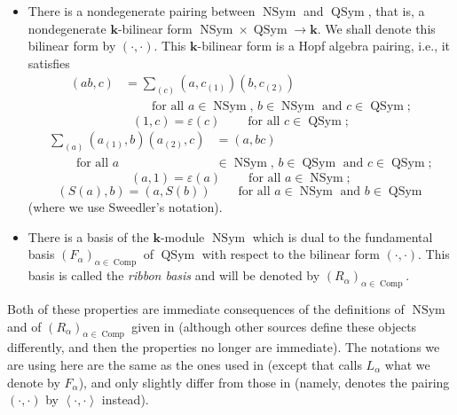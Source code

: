 \documentclass[numbers=enddot,12pt,final,onecolumn,notitlepage,abstracton]{scrartcl}%
\theoremstyle{definition}
\let\sumnonlimits\sum
\renewcommand{\sum}{\sumnonlimits\limits}
\begin{document}
\begin{itemize}
\item There is a nondegenerate pairing between $\operatorname*{NSym}$ and
$\operatorname*{QSym}$, that is, a nondegenerate $\mathbf{k}$-bilinear form
$\operatorname*{NSym}\times\operatorname*{QSym}\rightarrow\mathbf{k}$. We
shall denote this bilinear form by $\left(  \cdot,\cdot\right)  $. This
$\mathbf{k}$-bilinear form is a Hopf algebra pairing, i.e., it satisfies%
\begin{align}
\left(  ab,c\right)   &  =\sum_{\left(  c\right)  }\left(  a,c_{\left(
1\right)  }\right)  \left(  b,c_{\left(  2\right)  }\right)  \label{eq.(ab,c)}%
\\
&  \ \ \ \ \ \ \ \ \ \ \text{for all }a\in\operatorname*{NSym}\text{, }%
b\in\operatorname*{NSym}\text{ and }c\in\operatorname*{QSym};\nonumber
\end{align}%
\[
\left(  1,c\right)  =\varepsilon\left(  c\right)
\ \ \ \ \ \ \ \ \ \ \text{for all }c\in\operatorname*{QSym};
\]%
\begin{align*}
\sum_{\left(  a\right)  }\left(  a_{\left(  1\right)  },b\right)  \left(
a_{\left(  2\right)  },c\right)   &  =\left(  a,bc\right) \\
\ \ \ \ \ \ \ \ \ \ \text{for all }a  &  \in\operatorname*{NSym}\text{, }%
b\in\operatorname*{QSym}\text{ and }c\in\operatorname*{QSym};
\end{align*}%
\[
\left(  a,1\right)  =\varepsilon\left(  a\right)
\ \ \ \ \ \ \ \ \ \ \text{for all }a\in\operatorname*{NSym};
\]%
\[
\left(  S\left(  a\right)  ,b\right)  =\left(  a,S\left(  b\right)  \right)
\ \ \ \ \ \ \ \ \ \ \text{for all }a\in\operatorname*{NSym}\text{ and }%
b\in\operatorname*{QSym}%
\]
(where we use Sweedler's notation).

\item There is a basis of the $\mathbf{k}$-module $\operatorname*{NSym}$ which
is dual to the fundamental basis $\left(  F_{\alpha}\right)  _{\alpha
\in\operatorname*{Comp}}$ of $\operatorname*{QSym}$ with respect to the
bilinear form $\left(  \cdot,\cdot\right)  $. This basis is called the
\textit{ribbon basis} and will be denoted by $\left(  R_{\alpha}\right)
_{\alpha\in\operatorname*{Comp}}$.
\end{itemize}

Both of these properties are immediate consequences of the definitions of
$\operatorname*{NSym}$ and of $\left(  R_{\alpha}\right)  _{\alpha
\in\operatorname*{Comp}}$ given in \cite[Section 5.4]{Reiner} (although other
sources define these objects differently, and then the properties no longer
are immediate). The notations we are using here are the same as the ones used
in \cite[Section 5.4]{Reiner} (except that \cite[Section 5.4]{Reiner} calls
$L_{\alpha}$ what we denote by $F_{\alpha}$), and only slightly differ from
those in \cite{BBSSZ} (namely, \cite{BBSSZ} denotes the pairing $\left(
\cdot,\cdot\right)  $ by $\left\langle \cdot,\cdot\right\rangle $ instead).
\end{document}
